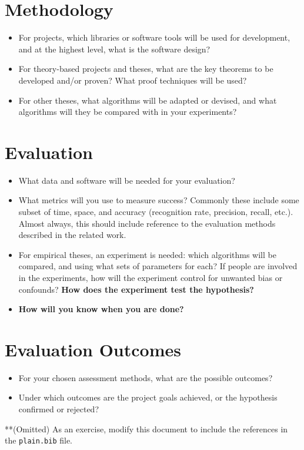 \documentclass[11pt]{artikel3}
\begin{document}
\section{Methodology}


\begin{itemize}
\item For projects, which libraries or software tools will be used for development, and at the highest level, what is the software design?
\item For theory-based projects and theses, what are the key theorems to be developed and/or proven? What proof techniques will be used?
\item For other theses, what algorithms will be adapted or devised, and what algorithms will they be compared with in your experiments?
\end{itemize}


\section{Evaluation}


\begin{itemize}
\item What data and software will be needed for your evaluation? 
\item What metrics
will you use to measure success? Commonly these include some subset of time, space, and accuracy (recognition rate, precision, recall, etc.).
Almost always, this should include reference to the evaluation methods described in the related work.
\item For empirical theses, an experiment is needed: which algorithms will be compared, and using what sets of parameters for each? If people are involved in the experiments, how will the experiment control for unwanted bias or confounds? {\bf How does the experiment test the hypothesis?}
\item {\bf How will you know when you are done?}
\end{itemize}


\section{Evaluation Outcomes}


\begin{itemize}
\item For your chosen assessment methods, what are the possible outcomes? 
\item Under which outcomes are the project goals achieved, or the hypothesis confirmed or rejected?
\end{itemize}






**(Omitted) As an exercise, modify this document to include the references in the {\tt plain.bib} file.
\end{document}
